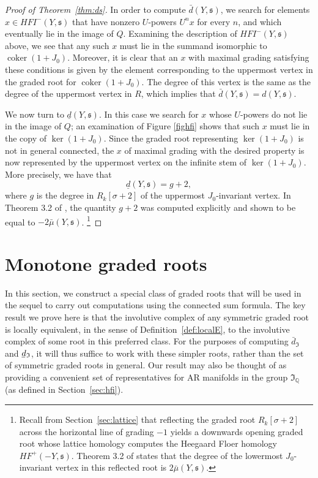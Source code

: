 \documentclass[11 pt]{amsart}
\theoremstyle{remark}
\DeclareMathOperator{\coker}{coker}
\newcommand\Q{\mathbb{Q}}
\def\s{\mathfrak s}
\def\ker {{\operatorname{ker}}}
\newcommand{\bunderline}[1]{\underline{#1\mkern-2mu}\mkern2mu }
\def\du {\bar{d}}
\def\dl {\bunderline{d}}
\def\HF {\mathit{HF}}
\newcommand\HFp {\HF^+}
\def\HFI {\mathit{HFI}}
\newcommand \HFIm {\HFI^-}
\def\Inv{\mathfrak{I}}
\begin{document}
\begin{proof}[Proof of Theorem~\ref{thm:ds}]
In order to compute $\du(Y, \s)$, we search for elements $x \in \HFIm(Y, \s)$ that have nonzero $U$-powers $U^nx$ for every $n$, and which eventually lie in the image of $Q$. Examining the description of $\HFIm(Y, \s)$ above, we see that any such $x$ must lie in the summand isomorphic to $\coker(1 + J_0)$. Moreover, it is clear that an $x$ with maximal grading satisfying these conditions is given by the element corresponding to the uppermost vertex in the graded root for $\coker(1 + J_0)$. The degree of this vertex is the same as the degree of the uppermost vertex in $R$, which implies that $\du(Y, \s) = d(Y, \s)$.

We now turn to $\underline{d}(Y, \s)$. In this case we search for $x$ whose $U$-powers do not lie in the image of $Q$; an examination of Figure \ref{fighfi} shows that such $x$ must lie in the copy of $\ker (1 + J_0)$. Since the graded root representing $\ker (1 + J_0)$ is not in general connected, the $x$ of maximal grading with the desired property is now represented by the uppermost vertex on the infinite stem of $\ker (1 + J_0)$. More precisely, we have that 
\[
\underline{d}(Y, \s) = g + 2, 
\]
where $g$ is the degree in $R_k[\sigma + 2]$ of the uppermost $J_0$-invariant vertex. In Theorem 3.2 of \cite{Dai}, the quantity $g+2$ was computed explicitly and shown to be equal to $- 2\bar{\mu}(Y, \s)$. \footnote{Recall from Section~\ref{sec:lattice} that reflecting the graded root $R_k[\sigma + 2]$ across the horizontal line of grading $-1$ yields a downwards opening graded root whose lattice homology computes the Heegaard Floer homology $\HFp(-Y, \s)$. Theorem 3.2 of \cite{Dai} states that the degree of the lowermost $J_0$-invariant vertex in this reflected root is $2\bar{\mu}(Y, \s)$.}
\end{proof}


\section{Monotone graded roots}\label{sec:monotone}

In this section, we construct a special class of graded roots that will be used in the sequel to carry out computations using the connected sum formula. The key result we prove here is that the involutive complex of any symmetric graded root is locally equivalent, in the sense of Definition~\ref{def:localE},  to the involutive complex of some root in this preferred class. For the purposes of computing $\du_{\Inv}$ and $\dl_{\Inv}$, it will thus suffice to work with these simpler roots, rather than the set of symmetric graded roots in general. Our result may also be thought of as providing a convenient set of representatives for AR manifolds in the group $\Inv_\Q$ (as defined in Section~\ref{sec:hfi}). 
\end{document}

